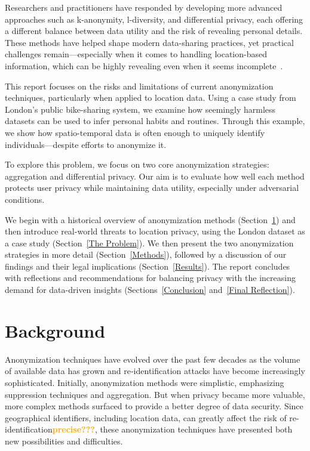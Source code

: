 \documentclass[twocolumn]{article}
\newcommand{\later}[1]{\textbf{\textcolor{orange}{#1}}}
\begin{document}
Researchers and practitioners have responded by developing more advanced approaches such as k-anonymity, l-diversity, and differential privacy, each offering a different balance between data utility and the risk of revealing personal details. These methods have helped shape modern data-sharing practices, yet practical challenges remain—especially when it comes to handling location-based information, which can be highly revealing even when it seems incomplete~\cite{montjoye2013unique}.

This report focuses on the risks and limitations of current anonymization techniques, particularly when applied to location data. Using a case study from London’s public bike-sharing system, we examine how seemingly harmless datasets can be used to infer personal habits and routines. Through this example, we show how spatio-temporal data is often enough to uniquely identify individuals—despite efforts to anonymize it.

To explore this problem, we focus on two core anonymization strategies: aggregation and differential privacy. Our aim is to evaluate how well each method protects user privacy while maintaining data utility, especially under adversarial conditions. 

We begin with a historical overview of anonymization methods (Section~\ref{Background}) and then introduce real-world threats to location privacy, using the London dataset as a case study (Section~\ref{The Problem}). We then present the two anonymization strategies in more detail (Section~\ref{Methods}), followed by a discussion of our findings and their legal implications (Section~\ref{Results}). The report concludes with reflections and recommendations for balancing privacy with the increasing demand for data-driven insights (Sections~\ref{Conclusion} and~\ref{Final Reflection}).


\section{Background} \label{Background}

Anonymization techniques have evolved over the past few decades as the volume of available data has grown and re‑identification attacks have become increasingly sophisticated. Initially, anonymization methods were simplistic, emphasizing suppression techniques and aggregation. But when privacy became more valuable, more complex methods surfaced to provide a better degree of data security. Since geographical identifiers, including location data, can greatly affect the risk of re-identification\later{precise???}, these anonymization techniques have presented both new possibilities and difficulties.
\end{document}
